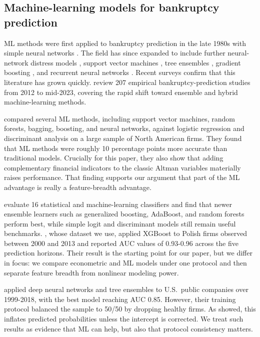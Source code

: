 \documentclass[12pt,a4paper]{article}
\begin{document}
\subsection{Machine-learning models for bankruptcy prediction}

ML methods were first applied to bankruptcy prediction in the late 1980s with
simple neural networks \citep{odom1990}. The field has since expanded to
include further neural-network distress models \citep{altman1994}, support
vector machines \citep{shin2005, min2005}, tree ensembles
\citep{barboza2017,jones2017}, gradient boosting \citep{zieba2016,
carmona2019}, and recurrent neural networks \citep{mai2019,pellegrino2024}.
Recent surveys confirm that this literature has grown quickly. \cite{dasilas2024}
review 207 empirical bankruptcy-prediction studies from 2012 to mid-2023,
covering the rapid shift toward ensemble and hybrid machine-learning methods.

\cite{barboza2017} compared several ML methods, including support vector
machines, random forests, bagging, boosting, and neural networks, against
logistic regression and discriminant analysis on a large sample of North
American firms. They found that ML methods were roughly 10 percentage points
more accurate than traditional models. Crucially for this paper, they also
show that adding complementary financial indicators to the classic Altman
variables materially raises performance. That finding supports our argument
that part of the ML advantage is really a feature-breadth advantage.

\cite{jones2017} evaluate 16 statistical and machine-learning classifiers and
find that newer ensemble learners such as generalized boosting, AdaBoost, and
random forests perform best, while simple logit and discriminant models still
remain useful benchmarks. \cite{zieba2016}, whose dataset we use, applied
XGBoost to Polish firms observed between 2000 and 2013 and reported AUC values
of 0.93-0.96 across the five prediction horizons. Their result is the starting
point for our paper, but we differ in focus: we compare econometric and ML
models under one protocol and then separate feature breadth from nonlinear
modeling power.

\cite{pellegrino2022} applied deep neural networks and tree ensembles to U.S.\
public companies over 1999-2018, with the best model reaching AUC 0.85.
However, their training protocol balanced the sample to 50/50 by dropping
healthy firms. As \cite{king2001} showed, this inflates predicted probabilities
unless the intercept is corrected. We treat such results as evidence that ML
can help, but also that protocol consistency matters.
\end{document}
